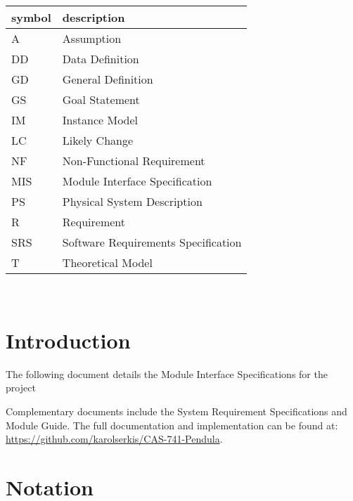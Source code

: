 \documentclass[12pt, titlepage]{article}
\begin{document}
\renewcommand{\arraystretch}{1.2}
\begin{tabular}{l l} 
  \toprule		
  \textbf{symbol} & \textbf{description}\\
  \midrule 
  A & Assumption\\
  DD & Data Definition\\
  GD & General Definition\\
  GS & Goal Statement\\
  IM & Instance Model\\
  LC & Likely Change\\
  NF & Non-Functional Requirement\\
  MIS & Module Interface Specification\\
  PS & Physical System Description\\
  R & Requirement\\
  SRS & Software Requirements Specification\\
  T & Theoretical Model\\
  \bottomrule
\end{tabular}\\

\newpage

\tableofcontents

\newpage


\section{Introduction}

The following document details the Module Interface Specifications for the 
\progname project

Complementary documents include the System Requirement Specifications
and Module Guide. The full documentation and implementation can be
found at: \\\url{https://github.com/karolserkis/CAS-741-Pendula}.  

\section{Notation}

  
\end{document}
